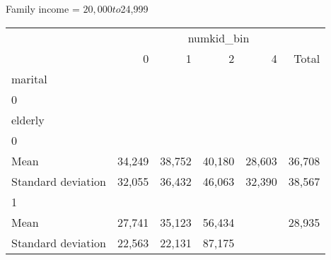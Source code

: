 Family income = $20,000 to $24,999
\begin{tabular}{llllll}
\cline{1-6}
\multicolumn{1}{c}{} &
  \multicolumn{5}{|c}{numkid\_bin} \\
\multicolumn{1}{c}{} &
  \multicolumn{1}{|r}{0} &
  \multicolumn{1}{r}{1} &
  \multicolumn{1}{r}{2} &
  \multicolumn{1}{r}{4} &
  \multicolumn{1}{r}{Total} \\
\cline{1-6}
\multicolumn{1}{l}{marital} &
  \multicolumn{1}{|r}{} &
  \multicolumn{1}{r}{} &
  \multicolumn{1}{r}{} &
  \multicolumn{1}{r}{} &
  \multicolumn{1}{r}{} \\
\multicolumn{1}{l}{\hspace{1em}0} &
  \multicolumn{1}{|r}{} &
  \multicolumn{1}{r}{} &
  \multicolumn{1}{r}{} &
  \multicolumn{1}{r}{} &
  \multicolumn{1}{r}{} \\
\multicolumn{1}{l}{\hspace{2em}elderly} &
  \multicolumn{1}{|r}{} &
  \multicolumn{1}{r}{} &
  \multicolumn{1}{r}{} &
  \multicolumn{1}{r}{} &
  \multicolumn{1}{r}{} \\
\multicolumn{1}{l}{\hspace{3em}0} &
  \multicolumn{1}{|r}{} &
  \multicolumn{1}{r}{} &
  \multicolumn{1}{r}{} &
  \multicolumn{1}{r}{} &
  \multicolumn{1}{r}{} \\
\multicolumn{1}{l}{\hspace{4em}Mean} &
  \multicolumn{1}{|r}{34,249} &
  \multicolumn{1}{r}{38,752} &
  \multicolumn{1}{r}{40,180} &
  \multicolumn{1}{r}{28,603} &
  \multicolumn{1}{r}{36,708} \\
\multicolumn{1}{l}{\hspace{4em}Standard deviation} &
  \multicolumn{1}{|r}{32,055} &
  \multicolumn{1}{r}{36,432} &
  \multicolumn{1}{r}{46,063} &
  \multicolumn{1}{r}{32,390} &
  \multicolumn{1}{r}{38,567} \\
\multicolumn{1}{l}{\hspace{3em}1} &
  \multicolumn{1}{|r}{} &
  \multicolumn{1}{r}{} &
  \multicolumn{1}{r}{} &
  \multicolumn{1}{r}{} &
  \multicolumn{1}{r}{} \\
\multicolumn{1}{l}{\hspace{4em}Mean} &
  \multicolumn{1}{|r}{27,741} &
  \multicolumn{1}{r}{35,123} &
  \multicolumn{1}{r}{56,434} &
  \multicolumn{1}{r}{} &
  \multicolumn{1}{r}{28,935} \\
\multicolumn{1}{l}{\hspace{4em}Standard deviation} &
  \multicolumn{1}{|r}{22,563} &
  \multicolumn{1}{r}{22,131} &
  \multicolumn{1}{r}{87,175} &

\end{tabular}

